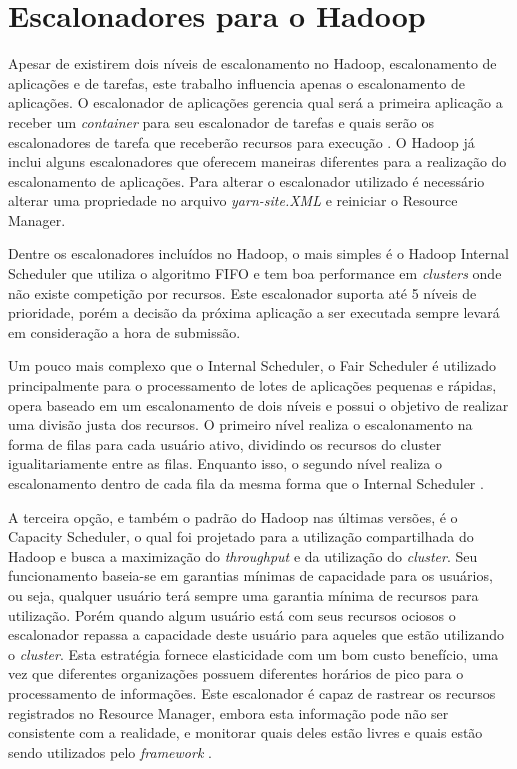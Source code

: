 
\section{Escalonadores para o Hadoop}
\label{sec:HadSched}
Apesar de existirem dois níveis de escalonamento no Hadoop, escalonamento de aplicações e de tarefas, este trabalho influencia apenas o escalonamento de aplicações. O escalonador de aplicações gerencia qual será a primeira aplicação a receber um \textit{container} para seu escalonador de tarefas e quais serão os escalonadores de tarefa que receberão recursos para execução \cite{BookHadoop}. O Hadoop já inclui alguns escalonadores que oferecem maneiras diferentes para a realização do escalonamento de aplicações. Para alterar o escalonador utilizado é necessário alterar uma propriedade no arquivo \textit{yarn-site.XML} e reiniciar o Resource Manager.

Dentre os escalonadores incluídos no Hadoop, o mais simples é o Hadoop Internal Scheduler que utiliza o algoritmo FIFO e tem boa performance em \textit{clusters} onde não existe competição por recursos. Este escalonador suporta até 5 níveis de prioridade, porém a decisão da próxima aplicação a ser executada sempre levará em consideração a hora de submissão.

Um pouco mais complexo que o Internal Scheduler, o Fair Scheduler é utilizado principalmente para o processamento de lotes de aplicações pequenas e rápidas, opera baseado em um escalonamento de dois níveis e possui o objetivo de realizar uma divisão justa dos recursos. O primeiro nível realiza o escalonamento na forma de filas para cada usuário ativo, dividindo os recursos do cluster igualitariamente entre as filas. Enquanto isso, o segundo nível realiza o escalonamento dentro de cada fila da mesma forma que o Internal Scheduler \cite{FairScheduler}. 

A terceira opção, e também o padrão do Hadoop nas últimas versões, é o Capacity Scheduler, o qual foi projetado para a utilização compartilhada do Hadoop e busca a maximização do \textit{throughput} e da utilização do \textit{cluster}. Seu funcionamento baseia-se em garantias mínimas de capacidade para os usuários, ou seja, qualquer usuário terá sempre uma garantia mínima de recursos para utilização. Porém quando algum usuário está com seus recursos ociosos o escalonador repassa a capacidade deste usuário  para aqueles que estão utilizando o \textit{cluster}. Esta estratégia fornece elasticidade com um bom custo benefício, uma vez que diferentes organizações possuem diferentes horários de pico para o processamento de informações. Este escalonador é capaz de rastrear os recursos registrados no Resource Manager, embora esta informação pode não ser consistente com a realidade, e monitorar quais deles estão livres e quais estão sendo utilizados pelo \textit{framework} \cite{CapacityScheduler}.

